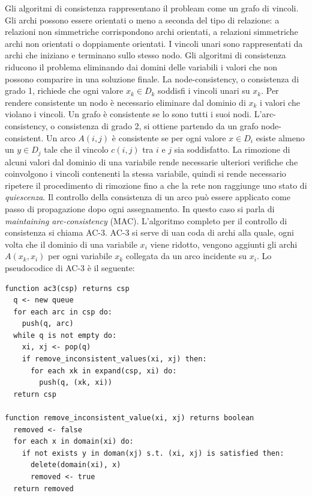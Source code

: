 \documentclass[answers, a4paper, 11pt]{exam}
\begin{document}
\begin{questions}
\begin{solution}
    Gli algoritmi di consistenza rappresentano il probleam come un grafo di vincoli. 
    Gli archi possono essere orientati o meno a seconda del tipo di relazione: a relazioni non simmetriche corrispondono archi orientati, a relazioni simmetriche archi non orientati o doppiamente orientati. 
    I vincoli unari sono rappresentati da archi che iniziano e terminano sullo stesso nodo. 
    Gli algoritmi di consistenza riducono il problema eliminando dai domini delle variabili i valori che non possono comparire in una soluzione finale. 
  La node-consistency, o consistenza di grado 1, richiede che ogni valore $x_k \in D_k$ soddisfi i vincoli unari su $x_k$. 
    Per rendere consistente un nodo è necessario eliminare dal dominio di $x_k$ i valori che violano i vincoli. 
    Un grafo è consistente se lo sono tutti i suoi nodi. 
    L'arc-consistency, o consistenza di grado 2, si ottiene partendo da un grafo node-consistent. 
    Un arco $A(i, j)$ è consistente se per ogni valore $x \in D_i$ esiste almeno un $y \in D_j$ tale che il vincolo $c(i, j)$ tra $i$ e $j$ sia soddisfatto. 
    La rimozione di alcuni valori dal dominio di una variabile rende necessarie ulteriori verifiche che coinvolgono i vincoli contenenti la stessa variabile, quindi si rende necessario ripetere il procedimento di rimozione fino a che la rete non raggiunge uno stato di \emph{quiescenza}. 
    Il controllo della consistenza di un arco può essere applicato come passo di propagazione dopo ogni assegnamento. 
    In questo caso si parla di \emph{maintaining arc-consistency} (MAC). 
    L'algoritmo completo per il controllo di consistenza si chiama AC-3. 
    AC-3 si serve di uan coda di archi alla quale, ogni volta che il dominio di una variabile $x_i$ viene ridotto, vengono aggiunti gli archi $A(x_k, x_i)$ per ogni variabile $x_k$ collegata da un arco incidente su $x_i$. 
    Lo pseudocodice di AC-3 è il seguente: 
\begin{verbatim}
function ac3(csp) returns csp
  q <- new queue
  for each arc in csp do:
    push(q, arc)
  while q is not empty do:
    xi, xj <- pop(q)
    if remove_inconsistent_values(xi, xj) then:
      for each xk in expand(csp, xi) do:
        push(q, (xk, xi))
  return csp

function remove_inconsistent_value(xi, xj) returns boolean
  removed <- false
  for each x in domain(xi) do:
    if not exists y in doman(xj) s.t. (xi, xj) is satisfied then:
      delete(domain(xi), x)
      removed <- true
  return removed
\end{verbatim}
  \end{solution}


\end{questions}
\end{document}
